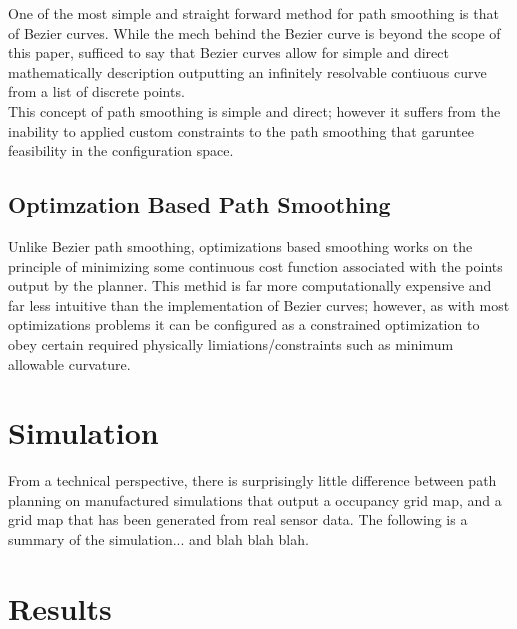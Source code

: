 \documentclass[journal]{IEEEtran}
\begin{document}
One of the most simple and straight forward method for path smoothing is that of Bezier curves. While the mech behind the Bezier curve is beyond the scope of this paper, sufficed to say that Bezier curves allow for simple and direct mathematically description outputting an infinitely resolvable contiuous curve from a list of discrete points.\\

This concept of path smoothing is simple and direct; however it suffers from the inability to applied custom constraints to the path smoothing that garuntee feasibility in the configuration space.

\subsection{Optimzation Based Path Smoothing}

Unlike Bezier path smoothing, optimizations based smoothing works on the principle of minimizing some continuous cost function associated with the points output by the planner. This methid is far more computationally expensive and far less intuitive than the implementation of Bezier curves; however, as with most optimizations problems it can be configured as a constrained optimization to obey certain required physically limiations/constraints such as minimum allowable curvature.  



\section{Simulation}

From a technical perspective, there is surprisingly little difference between path planning on manufactured simulations that output a occupancy grid map, and a grid map that has been generated from real sensor data. The following is a summary of the simulation... and blah blah blah. 


\section{Results}


\end{document}
